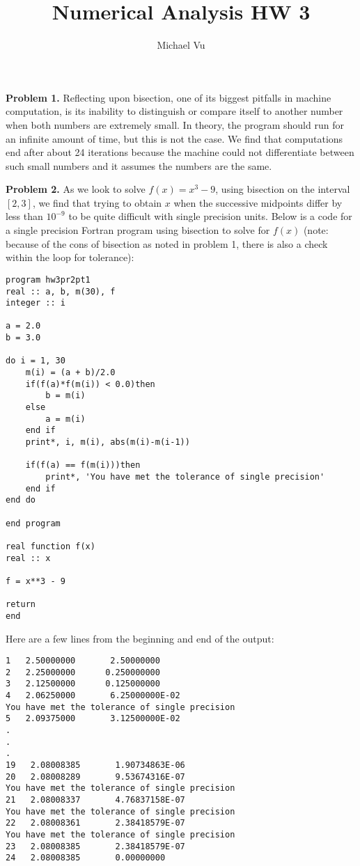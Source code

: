 \documentclass[12pt]{article}
\author{Michael Vu}
\title{Numerical Analysis HW 3}
\begin{document}
\maketitle 

\textbf{Problem 1.} Reflecting upon bisection, one of its biggest pitfalls in machine computation, is its inability to distinguish or compare itself to another number when both numbers are extremely small. In theory, the program should run for an infinite amount of time, but this is not the case. We find that computations end after about 24 iterations because the machine could not differentiate between such small numbers and it assumes the numbers are the same. 

\bigskip

\textbf{Problem 2.} As we look to solve $f(x)=x^3-9$, using bisection on the interval $[2,3]$, we find that trying to obtain $x$ when the successive midpoints differ by less than $10^{-9}$ to be quite difficult with single precision units. 
Below is a code for a single precision Fortran program using bisection to solve for $f(x)$ (note: because of the cons of bisection as noted in problem 1, there is also a check within the loop for tolerance):

\begin{verbatim}
program hw3pr2pt1
real :: a, b, m(30), f
integer :: i 

a = 2.0
b = 3.0

do i = 1, 30 
	m(i) = (a + b)/2.0
	if(f(a)*f(m(i)) < 0.0)then
		b = m(i)
	else
		a = m(i)
	end if
	print*, i, m(i), abs(m(i)-m(i-1))
	
	if(f(a) == f(m(i)))then
		print*, 'You have met the tolerance of single precision'
	end if 
end do

end program

real function f(x)
real :: x

f = x**3 - 9

return
end
\end{verbatim}

Here are a few lines from the beginning and end of the output:

\begin{verbatim}
1   2.50000000       2.50000000
2   2.25000000      0.250000000
3   2.12500000      0.125000000
4   2.06250000       6.25000000E-02
You have met the tolerance of single precision
5   2.09375000       3.12500000E-02
.
.
.
19   2.08008385       1.90734863E-06
20   2.08008289       9.53674316E-07
You have met the tolerance of single precision
21   2.08008337       4.76837158E-07
You have met the tolerance of single precision
22   2.08008361       2.38418579E-07
You have met the tolerance of single precision
23   2.08008385       2.38418579E-07
24   2.08008385       0.00000000
\end{verbatim}
\end{document}
